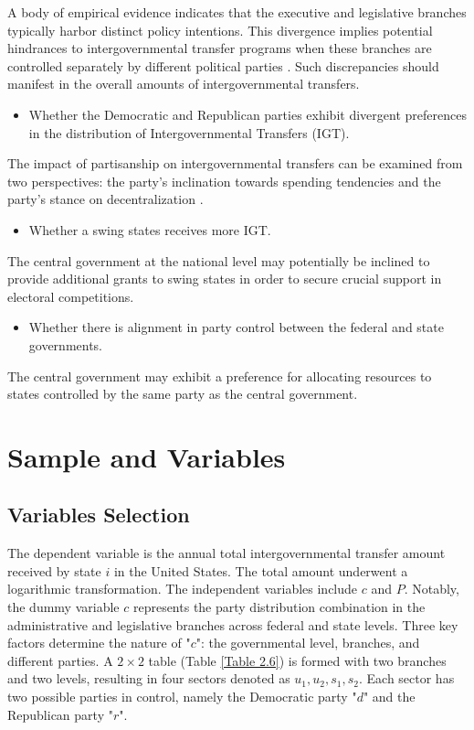 \documentclass[man]{apa7}
\begin{document}
A body of empirical evidence indicates that the executive and legislative branches typically harbor distinct policy intentions. This divergence implies potential hindrances to intergovernmental transfer programs when these branches are controlled separately by different political parties \parencite{peterson1994executive,carreras2014outsiders,farhang2012legislative}. Such discrepancies should manifest in the overall amounts of intergovernmental transfers.

\begin{itemize}
  \item Whether the Democratic and Republican parties exhibit divergent preferences in the distribution of Intergovernmental Transfers (IGT).
\end{itemize}

The impact of partisanship on intergovernmental transfers can be examined from two perspectives: the party's inclination towards spending tendencies and the party's stance on decentralization \parencite{dinan2020stability,freeman1986political}.

\begin{itemize}
  \item Whether a swing states receives more IGT.
\end{itemize}

The central government at the national level may potentially be inclined to provide additional grants to swing states in order to secure crucial support in electoral competitions.

\begin{itemize}
  \item Whether there is alignment in party control between the federal and state governments.
\end{itemize}

The central government may exhibit a preference for allocating resources to states controlled by the same party as the central government.%

\section{Sample and Variables}

\subsection{Variables Selection}

The dependent variable is the annual total intergovernmental transfer amount received by state $i$ in the United States. The total amount underwent a logarithmic transformation. The independent variables include $c$ and $P$. Notably, the dummy variable $c$ represents the party distribution combination in the administrative and legislative branches across federal and state levels. Three key factors determine the nature of "$c$": the governmental level, branches, and different parties. A $2\times2$ table (Table \ref{Table 2.6}) is formed with two branches and two levels, resulting in four sectors denoted as $u_1, u_2, s_1, s_2$. Each sector has two possible parties in control, namely the Democratic party "$d$" and the Republican party "$r$".
\end{document}
